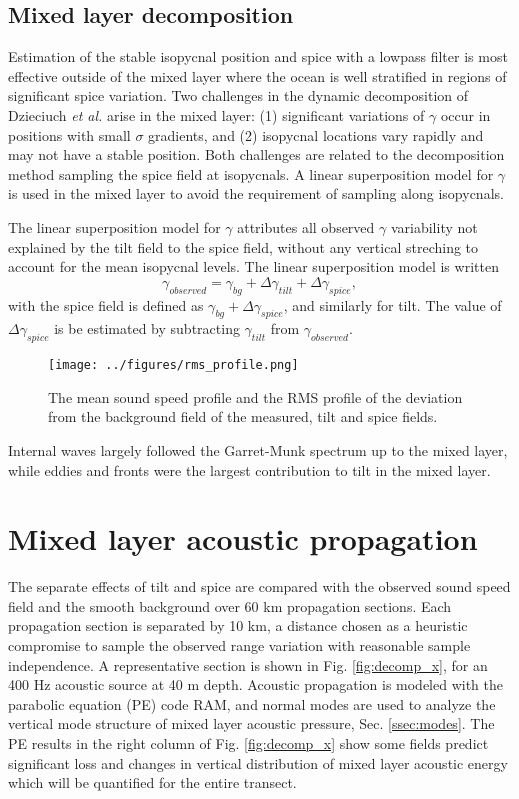 \documentclass[preprint,NumberedRefs]{JASA}
\begin{document}
\subsection{Mixed layer decomposition}
Estimation of the stable isopycnal position and spice with a lowpass filter is most effective outside of the mixed layer where the ocean is well stratified in regions of significant spice variation. Two challenges in the dynamic decomposition of Dzieciuch \emph{et al.}\citep{dzieciuch2004} arise in the mixed layer: (1) significant variations of $\gamma$ occur in positions with small $\sigma$ gradients, and (2) isopycnal locations vary rapidly and may not have a stable position. Both challenges are related to the decomposition method sampling the spice field at isopycnals. A linear superposition model for $\gamma$ is used in the mixed layer to avoid the requirement of sampling along isopycnals.

The linear superposition model for $\gamma$ attributes all observed $\gamma$ variability not explained by the tilt field to the spice field, without any vertical streching to account for the mean isopycnal levels. The linear superposition model is written
\begin{equation}
    \gamma_{observed} = \gamma_{bg} + \Delta \gamma_{tilt} + \Delta \gamma_{spice},
\end{equation}
with the spice field is defined as $\gamma_{bg} + \Delta \gamma_{spice}$, and similarly for tilt. The value of $\Delta \gamma_{spice}$ is be estimated by subtracting $\gamma_{tilt}$ from $\gamma_{observed}$.

\begin{figure}
\texttt{[image: ../figures/rms\_profile.png]}
    \caption{\label{fig:c_rms}{The mean sound speed profile and the RMS profile of the deviation from the background field of the measured, tilt and spice fields. }}
\end{figure}

Internal waves largely followed the Garret-Munk spectrum up to the mixed layer, while eddies and fronts were the largest contribution to tilt in the mixed layer.

\section{\label{sec:propagation}Mixed layer acoustic propagation}
The separate effects of tilt and spice are compared with the observed sound speed field and the smooth background over 60 km propagation sections. Each propagation section is separated by 10 km, a distance chosen as a heuristic compromise to sample the observed range variation with reasonable sample independence. A representative section is shown in Fig. \ref{fig:decomp_x}, for an 400 Hz acoustic source at 40 m depth. Acoustic propagation is modeled with the parabolic equation (PE) code RAM, and normal modes are used to analyze the vertical mode structure of mixed layer acoustic pressure, Sec. \ref{ssec:modes}. The PE results in the right column of Fig. \ref{fig:decomp_x} show some fields predict significant loss and changes in vertical distribution of mixed layer acoustic energy which will be quantified for the entire transect.
\end{document}
